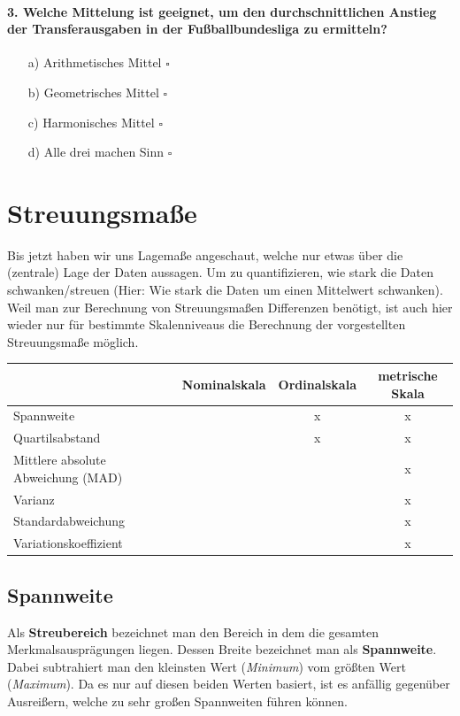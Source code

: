 \documentclass[a4paper]{article}
\begin{document}
\paragraph{3. Welche Mittelung ist geeignet, um den durchschnittlichen Anstieg der Transferausgaben in der Fußballbundesliga zu ermitteln?}

\begin{itemize}
    \item[a)] Arithmetisches Mittel \hfill $\square$
    \item[b)] Geometrisches Mittel \hfill $\square$
    \item[c)] Harmonisches Mittel \hfill $\square$
    \item[d)] Alle drei machen Sinn \hfill $\square$
\end{itemize}


\clearpage


\section{Streuungsmaße}
Bis jetzt haben wir uns Lagemaße angeschaut, welche nur etwas über die (zentrale) Lage der Daten aussagen. Um zu quantifizieren, wie stark die Daten schwanken/streuen (Hier: Wie stark die Daten um einen Mittelwert schwanken). Weil man zur Berechnung von Streuungsmaßen Differenzen benötigt, ist auch hier wieder nur für bestimmte Skalenniveaus die Berechnung der vorgestellten Streuungsmaße möglich.

\begin{center}
 \begin{tabular}{|l c c c|} 
 \hline
 & Nominalskala & Ordinalskala& metrische Skala\\
 \hline\hline
 Spannweite & & x & x \\ 
 \hline
Quartilsabstand &  & x & x \\
 \hline
 Mittlere absolute Abweichung (MAD) &  &  & x \\
 \hline
Varianz &  &  & x \\
 \hline
Standardabweichung &  &  & x \\
\hline
Variationskoeffizient & & & x\\
\hline  
\end{tabular}
\end{center}

\subsection{Spannweite}
Als \textbf{Streubereich} bezeichnet man den Bereich in dem die gesamten Merkmalsausprägungen liegen. Dessen Breite bezeichnet man als \textbf{Spannweite}. Dabei subtrahiert man den kleinsten Wert (\textit{Minimum}) vom größten Wert (\textit{Maximum}). Da es nur auf diesen beiden Werten basiert, ist es anfällig gegenüber Ausreißern, welche zu sehr großen Spannweiten führen können.\\
\end{document}
